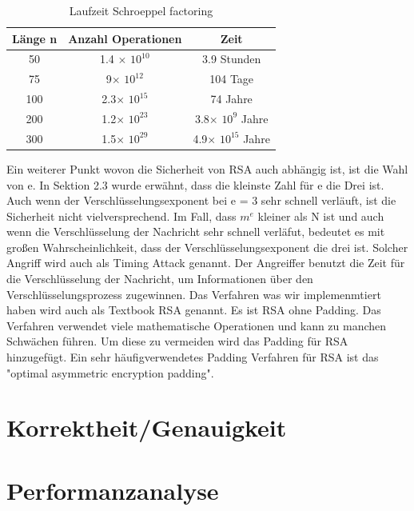 \documentclass[course=asp]{aspdoc}
\begin{document}
\begin{table}[H]
\centering
   \begin{tabular}{||c c c||} 
 \hline
 Länge n & Anzahl Operationen & Zeit  \\ [0.5ex] 
 \hline\hline
 50 & 1.4 $\times$ $10^{10}$  & 3.9 Stunden  \\ 
 \hline
 75 & 9$\times $ $10^{12}$  & 104 Tage  \\
 \hline
 100 & 2.3$\times $ $10^{15}$ & 74 Jahre  \\
 \hline
 200 & 1.2$\times $ $10^{23}$ & 3.8$\times $ $10^{9}$ Jahre\\
 \hline
 300 & 1.5$\times $ $10^{29}$ & 4.9$\times $ $10^{15}$ Jahre \\ [1ex] 
 \hline

\end{tabular}
    \caption{Laufzeit Schroeppel factoring}
\end{table}
Ein weiterer Punkt wovon die Sicherheit von RSA auch abhängig ist, ist die Wahl von e. In Sektion 2.3 wurde erwähnt, dass die kleinste Zahl für e die Drei ist. Auch wenn der Verschlüsselungsexponent bei e = 3 sehr schnell verläuft, ist die Sicherheit nicht vielversprechend. Im Fall, dass $m^{e}$ kleiner als N ist und auch wenn die Verschlüsselung der Nachricht sehr schnell verläfut, bedeutet es mit großen Wahrscheinlichkeit, dass der Verschlüsselungsexponent die drei ist. Solcher Angriff wird auch als Timing Attack genannt. Der Angreiffer benutzt die Zeit für die Verschlüsselung der Nachricht, um Informationen über den Verschlüsselungsprozess zugewinnen. 
Das Verfahren was wir implemenmtiert haben wird auch als Textbook RSA genannt. Es ist RSA ohne Padding. Das Verfahren verwendet viele mathematische Operationen und kann zu manchen Schwächen führen. Um diese zu vermeiden wird das Padding für RSA hinzugefügt.  Ein sehr häufigverwendetes Padding Verfahren für RSA ist das "optimal asymmetric encryption padding". 




\section{Korrektheit/Genauigkeit}


\section{Performanzanalyse}
\end{document}

